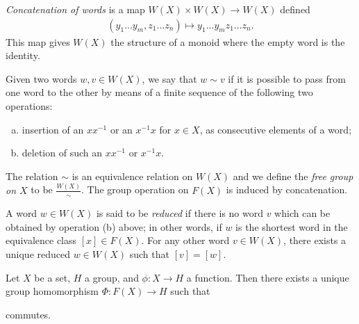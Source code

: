 \begin{defn}\label{def:concatenation}
	\emph{Concatenation of words} is a map $W(X)\times W(X) \to W(X)$ defined
	\begin{align*}
		(y_1...y_m, z_1...z_n) \mapsto y_1...y_mz_1...z_n.
	\end{align*}
	This map gives $W(X)$ the structure of a monoid where the empty word is the identity.
\end{defn}
\begin{defn}\label{def:expansion-contraction}
	Given two words $w,v \in W(X)$, we say that $w \sim v$ if it is possible to pass from one word to the other by means of a finite sequence of the following two operations:
	\begin{enumerate}[(a)]
		\item insertion of an $xx^{-1}$ or an $x^{-1}x$ for $x \in X$, as consecutive elements of a word;
		\item deletion of such an $xx^{-1}$ or $x^{-1}x$.
	\end{enumerate}
	The relation $\sim$ is an equivalence relation on $W(X)$ and we define the \emph{free group on $X$} to be $\frac{W(X)}{\sim}$. The group operation on $F(X)$ is induced by concatenation.
\end{defn}
\begin{defn}\label{def:reduced-word}
	A word $w \in W(X)$ is said to be \emph{reduced} if there is no word $v$ which can be obtained by operation (b) above; in other words, if $w$ is the shortest word in the equivalence class $[x]\in F(X)$. For any other word $v \in W(X)$, there exists a unique reduced $w \in W(X)$ such that $[v] = [w]$.
\end{defn}
\begin{thm}\label{thm:universal-property-of-free-group}
	Let $X$ be a set, $H$ a group, and $\phi:X\to H$ a function. Then there exists a unique group homomorphism $\Phi:F(X)\to H$ such that
	\begin{center}
	\end{center}
	commutes.
\end{thm}










